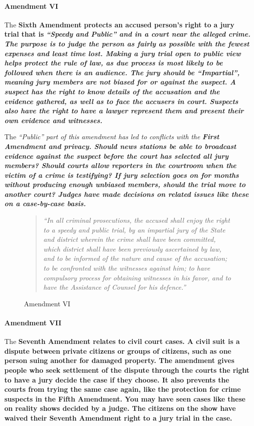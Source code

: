 \paragraph{Amendment VI}

The \bf{Sixth Amendment} protects an accused person’s right to a jury trial that is \it{“Speedy and Public”} and in a court near the alleged crime. The purpose is to judge the person as fairly as possible with the fewest expenses and least time lost. Making a jury trial open to public view helps protect the rule of law, as due process is most likely to be followed when there is an audience. The jury should be \it{“Impartial”}, meaning jury members are not biased for or against the suspect. A suspect has the right to know details of the accusation and the evidence gathered, as well as to face the accusers in court. Suspects also have the right to have a lawyer represent them and present their own evidence and witnesses.

The \it{“Public”} part of this amendment has led to conflicts with the \bf{First Amendment} and privacy. Should news stations be able to broadcast evidence against the suspect before the court has selected all jury members? Should courts allow reporters in the courtroom when the victim of a crime is testifying? If jury selection goes on for months without producing enough unbiased members, should the trial move to another court? Judges have made decisions on related issues like these on a case-by-case basis.

\begin{figure}[h]
    \begin{quote}
        \it{“In all criminal prosecutions, the accused shall enjoy the right to a speedy and public trial, by an impartial jury of the State and district wherein the crime shall have been committed, which district shall have been previously ascertained by law, and to be informed of the nature and cause of the accusation; to be confronted with the witnesses against him; to have compulsory process for obtaining witnesses in his favor, and to have the Assistance of Counsel for his defence.”}
    \end{quote}
    \caption{Amendment VI}
\end{figure}

\paragraph{Amendment VII}

The \bf{Seventh Amendment} relates to civil court cases. A civil suit is a dispute between private citizens or groups of citizens, such as one person suing another for damaged property. The amendment gives people who seek settlement of the dispute through the courts the right to have a jury decide the case if they choose. It also prevents the courts from trying the same case again, like the protection for crime suspects in the Fifth Amendment. You may have seen cases like these on reality shows decided by a judge. The citizens on the show have waived their Seventh Amendment right to a jury trial in the case.

